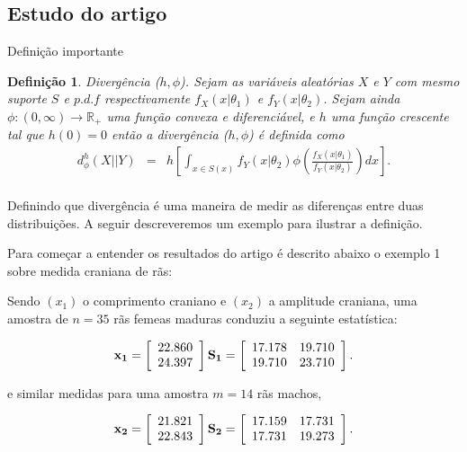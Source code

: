 \documentclass[12pt,a4paper]{article}
\newtheorem{definition}{Definição}[section]
\begin{document}
\subsection{Estudo do artigo  \cite{salicru_pardo_1994}}

Definição importante  

\begin{definition}{Divergência ($h,\phi$).}
	Sejam as variáveis aleatórias $X$ e $Y$ com mesmo suporte $S$  e $p.d.f$ respectivamente $f_{X}(x|\theta_1)$ e $f_{Y}(x|\theta_2)$. Sejam ainda $\phi:(0,\infty)\rightarrow \mathbb{R}_+$ uma função convexa e diferenciável, e $h$ uma função crescente tal que $h(0)=0$ então a divergência ($h,\phi$) é definida como
\begin{equation}\label{sec3eqn1}
\begin{array}{ccc}
	d_{\phi}^{h}(X||Y)&=&\displaystyle{h\left[\int_{x\in S(x)} f_{Y}(x|\theta_2)\phi\left(\frac{f_{X}(x|\theta_1)}{f_{Y}(x|\theta_2)}\right)dx \right]}. \\
\end{array}
\end{equation}
\end{definition}

Definindo que divergência é uma maneira de medir as diferenças entre duas distribuições. A seguir descreveremos um exemplo para ilustrar a definição.

Para começar a entender os resultados do artigo \cite{salicru_pardo_1994} é descrito abaixo o exemplo 1 sobre medida craniana de rãs:

Sendo $(x_1)$ o comprimento craniano e $(x_2)$ a amplitude craniana, uma amostra de $n=35$ rãs femeas maduras conduziu a seguinte estatística:

$$
{\bf x_1} = \left[
\begin{array}{c}
	22.860   \\
	24.397   \\
\end{array}
\right]
{\bf S_1} = \left[
\begin{array}{cc}
	 17.178  & 19.710   \\
         19.710  & 23.710   \\
\end{array}
\right].
$$

e similar medidas para uma amostra $m=14$ rãs machos, 

$$
{\bf x_2} = \left[
\begin{array}{c}
	21.821  \\
	22.843   \\
\end{array}
\right]
{\bf S_2} = \left[
\begin{array}{cc}
	 17.159  & 17.731   \\
         17.731  & 19.273   \\
\end{array}
\right].
$$
\end{document}
